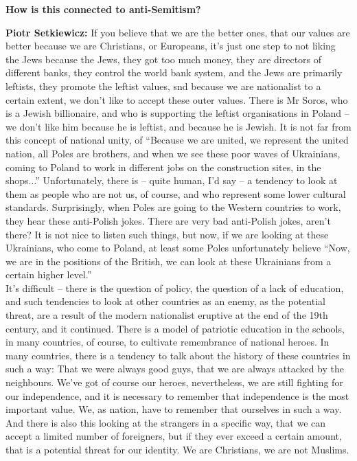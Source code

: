 \textbf{How is this connected to anti-Semitism?} 

\textbf{Piotr Setkiewicz:} If you believe that we are the better ones, that our values are better because we are Christians, or Europeans, it’s just one step to not liking the Jews because the Jews, they got too much money, they are directors of different banks, they control the world bank system, and the Jews are primarily leftists, they promote the leftist values, snd because we are nationalist to a certain extent, we don’t like to accept these outer values. There is Mr Soros, who is a Jewish billionaire, and who is supporting the leftist organisations in Poland – we don’t like him because he is leftist, and because he is Jewish. It is not far from this concept of national unity, of ``Because we are united, we represent the united nation, all Poles are brothers, and when we see these poor waves of Ukrainians, coming to Poland to work in different jobs on the construction sites, in the shops...'' Unfortunately, there is – quite human, I’d say – a tendency to look at them as people who are not us, of course, and who represent some lower cultural standards. Surprisingly, when Poles are going to the Western countries to work, they hear these anti-Polish jokes. There are very bad anti-Polish jokes, aren’t there? It is not nice to listen such things, but now, if we are looking at these Ukrainians, who come to Poland, at least some Poles unfortunately believe ``Now, we are in the positions of the British, we can look at these Ukrainians from a certain higher level.'' \\
It’s difficult – there is the question of policy, the question of a lack of education, and such tendencies to look at other countries as an enemy, as the potential threat, are a result of the modern nationalist eruptive at the end of the 19th century, and it continued. There is a model of patriotic education in the schools, in many countries, of course, to cultivate remembrance of national heroes. In many countries, there is a tendency to talk about the history of these countries in such a way: That we were always good guys, that we are always attacked by the neighbours. We’ve got of course our heroes, nevertheless, we are still fighting for our independence, and it is necessary to remember that independence is the most important value. We, as nation, have to remember that ourselves in such a way. And there is also this looking at the strangers in a specific way, that we can accept a limited number of foreigners, but if they ever exceed a certain amount, that is a potential threat for our identity. We are Christians, we are not Muslims.\\
